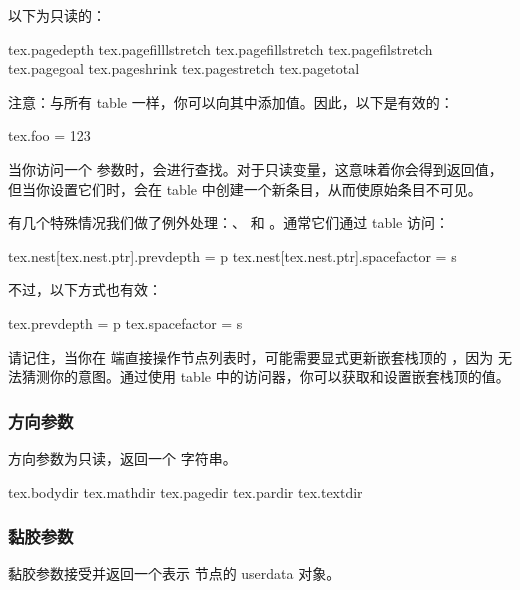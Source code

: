 以下为只读的：

\startthreecolumns
\begin{typing}
tex.pagedepth
tex.pagefilllstretch
tex.pagefillstretch
tex.pagefilstretch
tex.pagegoal
tex.pageshrink
tex.pagestretch
tex.pagetotal
\end{typing}
\stopthreecolumns

注意：与所有 \LUA table 一样，你可以向其中添加值。因此，以下是有效的：

\begin{typing}
tex.foo = 123
\end{typing}

当你访问一个 \TEX 参数时，会进行查找。对于只读变量，这意味着你会得到返回值，
但当你设置它们时，会在 table 中创建一个新条目，从而使原始条目不可见。

有几个特殊情况我们做了例外处理：、 和
。通常它们通过  table 访问：

\begin{typing}
tex.nest[tex.nest.ptr].prevdepth   = p
tex.nest[tex.nest.ptr].spacefactor = s
\end{typing}

不过，以下方式也有效：

\begin{typing}
tex.prevdepth   = p
tex.spacefactor = s
\end{typing}

请记住，当你在 \LUA 端直接操作节点列表时，可能需要显式更新嵌套栈顶的
，因为 \LUATEX 无法猜测你的意图。通过使用 
table 中的访问器，你可以获取和设置嵌套栈顶的值。

\subsubsection{方向参数}

方向参数为只读，返回一个 \LUA 字符串。

\startthreecolumns
\begin{typing}
tex.bodydir
tex.mathdir
tex.pagedir
tex.pardir
tex.textdir
\end{typing}
\stopthreecolumns

\subsubsection{黏胶参数}

黏胶参数接受并返回一个表示  节点的 userdata 对象。

